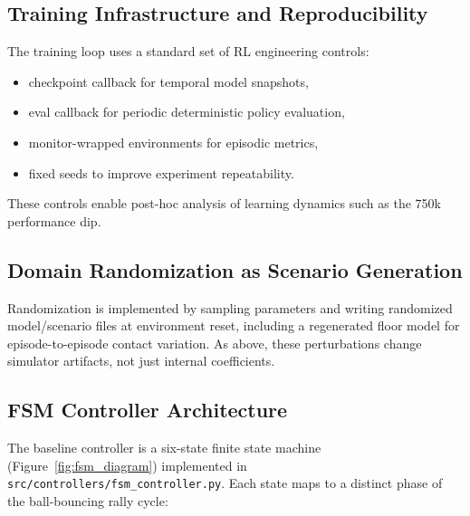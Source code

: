 \documentclass[10pt,twocolumn,letterpaper]{article}
\begin{document}
\subsection{Training Infrastructure and Reproducibility}
The training loop uses a standard set of RL engineering controls:
\begin{itemize}[leftmargin=*,noitemsep]
    \item checkpoint callback for temporal model snapshots,
    \item eval callback for periodic deterministic policy evaluation,
    \item monitor-wrapped environments for episodic metrics,
    \item fixed seeds to improve experiment repeatability.
\end{itemize}
These controls enable post-hoc analysis of learning dynamics such as the 750k performance dip.

\subsection{Domain Randomization as Scenario Generation}
Randomization is implemented by sampling parameters and writing randomized model/scenario files at environment reset, including a regenerated floor model for episode-to-episode contact variation. As above, these perturbations change simulator artifacts, not just internal coefficients.

\subsection{FSM Controller Architecture}
\label{sec:fsm_architecture}
The baseline controller is a six-state finite state machine (Figure~\ref{fig:fsm_diagram}) implemented in \texttt{src/controllers/fsm\_controller.py}. Each state maps to a distinct phase of the ball-bouncing rally cycle:
\end{document}
